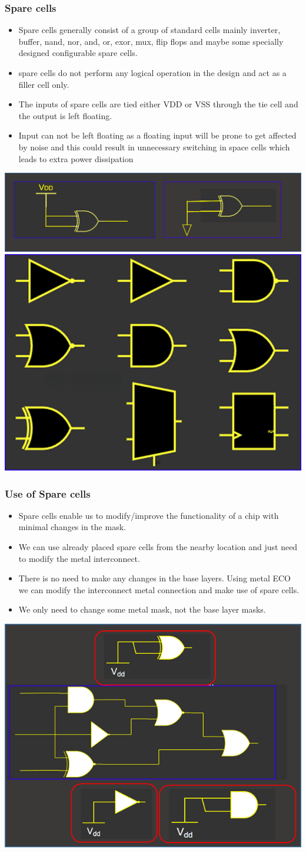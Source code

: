 \documentclass{beamer}
\begin{document}
\begin{frame}
	\frametitle{Spare cells}
	\begin{itemize}
		\item Spare cells generally consist of a group of standard cells mainly inverter, buffer, nand, nor, and, or, exor, mux, flip flops and maybe some specially designed configurable spare cells.
		\item spare cells do not perform any logical operation in the design and act as a filler cell only.
		\item The inputs of spare cells are tied either VDD or VSS through the tie cell and the output is left floating.
		\item Input can not be left floating as a floating input will be prone to get affected by noise and this could result in unnecessary switching in space cells which leads to extra power dissipation
	\end{itemize}
	\begin{center}
		\includegraphics[width=0.3 \textwidth]{spareCellTie} \quad \quad
		\includegraphics[width=0.3 \textwidth]{spareCell}
	\end{center}
\end{frame}	
\begin{frame}
	\frametitle{Use of Spare cells}
	\begin{itemize}
		\item Spare cells enable us to modify/improve the functionality of a chip with minimal changes in the mask. 
		\item We can use already placed spare cells from the nearby location and just need to modify the metal interconnect.
		\item There is no need to make any changes in the base layers. Using metal ECO we can modify the interconnect metal connection and make use of spare cells.
		\item We only need to change some metal mask, not the base layer masks.
	\end{itemize}
	\begin{center}
		\includegraphics[width=0.3 \textwidth]{sparecellUse} 
	\end{center}
\end{frame}	
\end{document}
